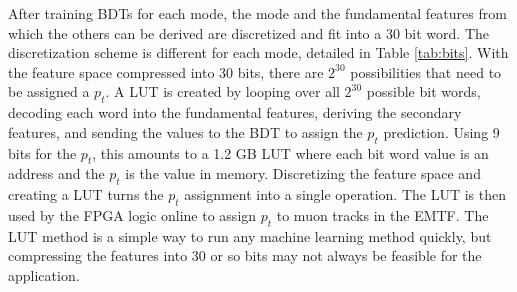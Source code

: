 After training BDTs for each mode, the mode and the fundamental features from which the others can be derived are discretized and fit into a 30 bit word. The discretization scheme is different for each mode, detailed in Table \ref{tab:bits}. With the feature space compressed into 30 bits, there are $2^{30}$ possibilities that need to be assigned a $p_t$. A LUT is created by looping over all $2^{30}$ possible bit words, decoding each word into the fundamental features, deriving the secondary features, and sending the values to the BDT to assign the $p_t$ prediction. Using 9 bits for the $p_t$, this amounts to a 1.2 GB LUT where each bit word value is an address and the $p_t$ is the value in memory. Discretizing the feature space and creating a LUT turns the $p_t$ assignment into a single operation. The LUT is then used by the FPGA logic online to assign $p_t$ to muon tracks in the EMTF. The LUT method is a simple way to run any machine learning method quickly, but compressing the features into 30 or so bits may not always be feasible for the application.

